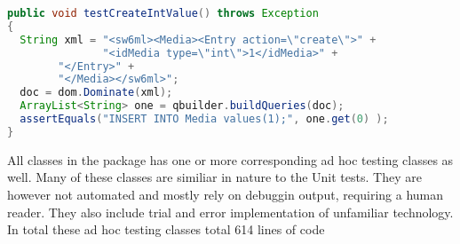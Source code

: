\begin{Code}
\begin{lstlisting}[label=code:testCase,language=java,caption=A JUnit test case]
public void testCreateIntValue() throws Exception
{
  String xml = "<sw6ml><Media><Entry action=\"create\">" +
               "<idMedia type=\"int\">1</idMedia>" +
		"</Entry>" +
		"</Media></sw6ml>";
  doc = dom.Dominate(xml);
  ArrayList<String> one = qbuilder.buildQueries(doc);
  assertEquals("INSERT INTO Media values(1);", one.get(0) );	
}
\end{lstlisting}
\end{Code}

All classes in the  package has one or more corresponding ad hoc testing classes as well. Many of these classes are similiar in nature to the Unit tests.
They are however not automated and mostly rely on  debuggin output, requiring a human reader. 
They also include trial and error implementation of unfamiliar technology.
In total these ad hoc testing classes total 614 lines of code



